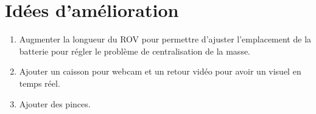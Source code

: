 \documentclass[11pt,a4paper]{article}
\begin{document}
      

    
    \section{Idées d'amélioration}
      \begin{enumerate}
        \item Augmenter la longueur du ROV pour permettre d'ajuster l'emplacement de la batterie pour régler le problème de centralisation de la masse.
        \item Ajouter un caisson pour webcam et un retour vidéo pour avoir un visuel en temps réel.
        \item Ajouter des pinces.
      \end{enumerate}


% 
% 
%   
\end{document}
